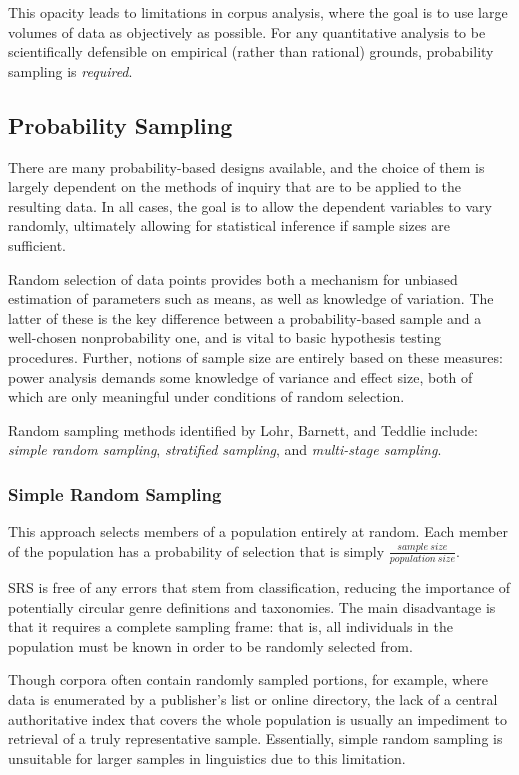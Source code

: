 This opacity leads to limitations in corpus analysis, where the goal is to use large volumes of data as objectively as possible.  For any quantitative analysis to be scientifically defensible on empirical (rather than rational) grounds, probability sampling is \textsl{required}.




\subsection{Probability Sampling}
There are many probability-based designs available, and the choice of them is largely dependent on the methods of inquiry that are to be applied to the resulting data.  In all cases, the goal is to allow the dependent variables to vary randomly, ultimately allowing for statistical inference if sample sizes are sufficient.

Random selection of data points provides both a mechanism for unbiased estimation of parameters such as means, as well as knowledge of variation.  The latter of these is the key difference between a probability-based sample and a well-chosen nonprobability one, and is vital to basic hypothesis testing procedures.  Further, notions of sample size are entirely based on these measures: power analysis demands some knowledge of variance and effect size, both of which are only meaningful under conditions of random selection.

Random sampling methods identified by Lohr, Barnett, and Teddlie\cite{lohr2009sampling,barnett1991sample,Teddlie01012007} include: \textsl{simple random sampling}, \textsl{stratified sampling}, and \textsl{multi-stage sampling}.

\subsubsection{Simple Random Sampling}
This approach selects members of a population entirely at random.  Each member of the population has a probability of selection that is simply $\frac{sample~size}{population~size}$.

SRS is free of any errors that stem from classification, reducing the importance of potentially circular genre definitions and taxonomies.  The main disadvantage is that it requires a complete sampling frame: that is, all individuals in the population must be known in order to be randomly selected from.

Though corpora often contain randomly sampled portions, for example, where data is enumerated by a publisher's list or online directory, the lack of a central authoritative index that covers the whole population is usually an impediment to retrieval of a truly representative sample.  Essentially, simple random sampling is unsuitable for larger samples in linguistics due to this limitation.

